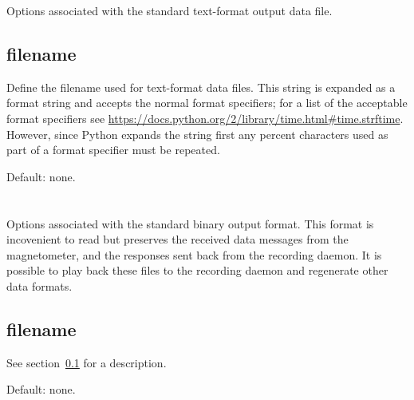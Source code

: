 Options associated with the standard text-format output data file.

\subsection{filename}
\label{sec:config-data-filename}
Define the filename used for text-format data files. This string is
expanded as a  format string and accepts the normal
 format specifiers; for a list of the acceptable format
specifiers see
\url{https://docs.python.org/2/library/time.html#time.strftime}. However,
since Python expands the string first any percent characters used as
part of a  format specifier must be repeated.

Default: none.


\section{\code{[awpacket]}}
Options associated with the standard binary output format. This format
is incovenient to read but preserves the received data messages from
the magnetometer, and the responses sent back from the recording
daemon. It is possible to play back these files to the recording
daemon and regenerate other data formats.

\subsection{filename}

See section~\ref{sec:config-data-filename} for a description.

Default: none.


